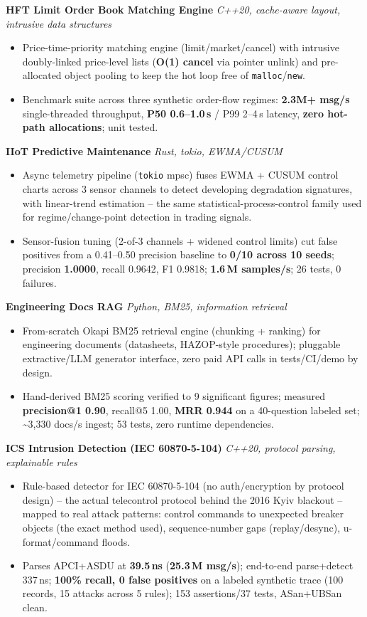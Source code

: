 \documentclass[10pt]{article}
\newcommand{\projectentry}[2]{%
  \noindent\textbf{#1} \hfill \textit{#2}\\[-0.3em]
}
\begin{document}
\projectentry{HFT Limit Order Book Matching Engine}{C++20, cache-aware layout, intrusive data structures}
\begin{itemize}
  \item Price-time-priority matching engine (limit/market/cancel) with intrusive doubly-linked price-level lists (\textbf{O(1) cancel} via pointer unlink) and pre-allocated object pooling to keep the hot loop free of \texttt{malloc}/\texttt{new}.
  \item Benchmark suite across three synthetic order-flow regimes: \textbf{2.3M+ msg/s} single-threaded throughput, \textbf{P50 0.6--1.0\,\textmu s} / P99 2--4\,\textmu s latency, \textbf{zero hot-path allocations}; unit tested.
\end{itemize}

\projectentry{IIoT Predictive Maintenance}{Rust, tokio, EWMA/CUSUM}
\begin{itemize}
  \item Async telemetry pipeline (\texttt{tokio} mpsc) fuses EWMA + CUSUM control charts across 3 sensor channels to detect developing degradation signatures, with linear-trend estimation -- the same statistical-process-control family used for regime/change-point detection in trading signals.
  \item Sensor-fusion tuning (2-of-3 channels + widened control limits) cut false positives from a 0.41--0.50 precision baseline to \textbf{0/10 across 10 seeds}; precision \textbf{1.0000}, recall 0.9642, F1 0.9818; \textbf{1.6\,M samples/s}; 26 tests, 0 failures.
\end{itemize}

\projectentry{Engineering Docs RAG}{Python, BM25, information retrieval}
\begin{itemize}
  \item From-scratch Okapi BM25 retrieval engine (chunking + ranking) for engineering documents (datasheets, HAZOP-style procedures); pluggable extractive/LLM generator interface, zero paid API calls in tests/CI/demo by design.
  \item Hand-derived BM25 scoring verified to 9 significant figures; measured \textbf{precision@1 0.90}, recall@5 1.00, \textbf{MRR 0.944} on a 40-question labeled set; \textasciitilde3{,}330 docs/s ingest; 53 tests, zero runtime dependencies.
\end{itemize}

\projectentry{ICS Intrusion Detection (IEC 60870-5-104)}{C++20, protocol parsing, explainable rules}
\begin{itemize}
  \item Rule-based detector for IEC 60870-5-104 (no auth/encryption by protocol design) -- the actual telecontrol protocol behind the 2016 Kyiv blackout -- mapped to real attack patterns: control commands to unexpected breaker objects (the exact method used), sequence-number gaps (replay/desync), u-format/command floods.
  \item Parses APCI+ASDU at \textbf{39.5\,ns} (\textbf{25.3\,M msg/s}); end-to-end parse+detect 337\,ns; \textbf{100\% recall, 0 false positives} on a labeled synthetic trace (100 records, 15 attacks across 5 rules); 153 assertions/37 tests, ASan+UBSan clean.
\end{itemize}
\end{document}

